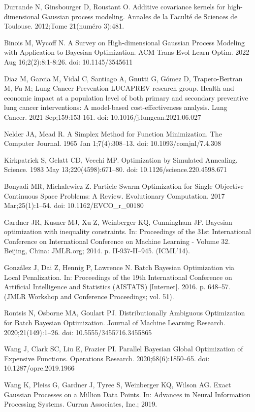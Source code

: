\documentclass{IOS-Book-Article}
\begin{document}
\begin{thebibliography}{99}
		Durrande N, Ginsbourger D, Roustant O. Additive covariance kernels for high-dimensional Gaussian process modeling. Annales de la Faculté de Sciences de Toulouse. 2012;Tome 21(numéro 3):481. 
		
		Binois M, Wycoff N. A Survey on High-dimensional Gaussian Process Modeling with Application to Bayesian Optimization. ACM Trans Evol Learn Optim. 2022 Aug 16;2(2):8:1-8:26. doi: 10.1145/3545611
		
		Diaz M, Garcia M, Vidal C, Santiago A, Gnutti G, Gómez D, Trapero-Bertran M, Fu M; Lung Cancer Prevention LUCAPREV research group. Health and economic impact at a population level of both primary and secondary preventive lung cancer interventions: A model-based cost-effectiveness analysis. Lung Cancer. 2021 Sep;159:153-161. doi: 10.1016/j.lungcan.2021.06.027
		
		Nelder JA, Mead R. A Simplex Method for Function Minimization. The Computer Journal. 1965 Jan 1;7(4):308–13. doi: 10.1093/comjnl/7.4.308
		
		Kirkpatrick S, Gelatt CD, Vecchi MP. Optimization by Simulated Annealing. Science. 1983 May 13;220(4598):671–80. doi: 10.1126/science.220.4598.671
		
		Bonyadi MR, Michalewicz Z. Particle Swarm Optimization for Single Objective Continuous Space Problems: A Review. Evolutionary Computation. 2017 Mar;25(1):1–54. doi: 10.1162/EVCO\_r\_00180
		
		Gardner JR, Kusner MJ, Xu Z, Weinberger KQ, Cunningham JP. Bayesian optimization with inequality constraints. In: Proceedings of the 31st International Conference on International Conference on Machine Learning - Volume 32. Beijing, China: JMLR.org; 2014. p. II-937-II–945. (ICML’14). 
		
		González J, Dai Z, Hennig P, Lawrence N. Batch Bayesian Optimization via Local Penalization. In: Proceedings of the 19th International Conference on Artificial Intelligence and Statistics (AISTATS) [Internet]. 2016. p. 648–57. (JMLR Workshop and Conference Proceedings; vol. 51).
		
		Rontsis N, Osborne MA, Goulart PJ. Distributionally Ambiguous Optimization for Batch Bayesian Optimization. Journal of Machine Learning Research. 2020;21(149):1–26. doi: 10.5555/3455716.3455865
		
		Wang J, Clark SC, Liu E, Frazier PI. Parallel Bayesian Global Optimization of Expensive Functions. Operations Research. 2020;68(6):1850–65. doi: 10.1287/opre.2019.1966
		
		Wang K, Pleiss G, Gardner J, Tyree S, Weinberger KQ, Wilson AG. Exact Gaussian Processes on a Million Data Points. In: Advances in Neural Information Processing Systems. Curran Associates, Inc.; 2019.

		
	\end{thebibliography}
	
\end{document}
